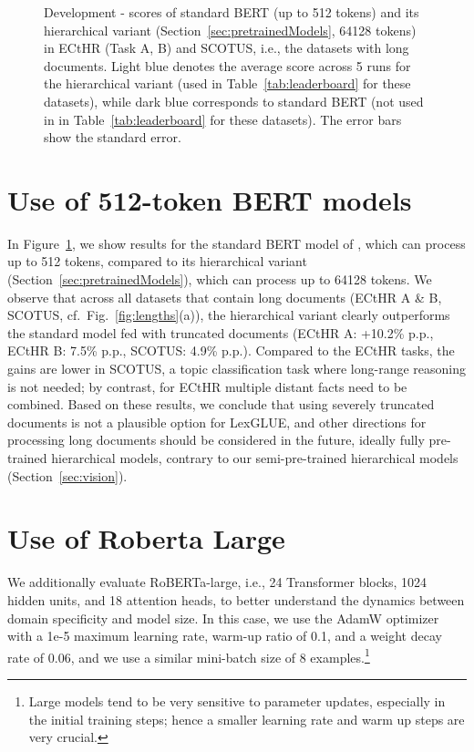\documentclass[11pt]{article}
\newcommand{\macrof}{-\xspace}
\begin{document}
\begin{figure}[h]
    \centering
    \caption{Development \macrof scores of standard BERT (up to 512 tokens) and its hierarchical variant (Section~\ref{sec:pretrainedModels}, 64128 tokens) in ECtHR (Task A, B) and SCOTUS, i.e., the datasets with long documents. Light blue denotes the average score across 5 runs for the hierarchical variant (used in Table~\ref{tab:leaderboard} for these datasets), while dark blue corresponds to standard BERT (not used in in Table~\ref{tab:leaderboard} for these datasets). The error bars show the standard error.
    }
    \vspace{-2mm}
    \label{fig:bert_base_truncated}
    \vspace{-4mm}
\end{figure}

\section{Use of 512-token BERT models}
\label{sec:bert_truncated}
In Figure~\ref{fig:bert_base_truncated}, we show results for the standard BERT model of \citet{devlin-etal-2019-bert}, which can process up to 512 tokens, compared to its hierarchical variant (Section~\ref{sec:pretrainedModels}), which can process up to 64128 tokens. We observe that across all datasets that contain long documents (ECtHR A \& B, SCOTUS, cf.\ Fig.~\ref{fig:lengths}(a)), the hierarchical variant clearly outperforms the standard model fed with truncated documents (ECtHR A: +10.2\% p.p., ECtHR B: 7.5\% p.p., SCOTUS: 4.9\% p.p.). Compared to the ECtHR tasks, the gains are lower in SCOTUS, a topic classification task where long-range reasoning is not needed; by contrast, for ECtHR multiple distant facts need to be combined. Based on these results, we conclude that using severely truncated documents is not a plausible option for LexGLUE, and other directions for processing long documents should be considered in the future, ideally fully pre-trained hierarchical models, contrary to our semi-pre-trained hierarchical models (Section~\ref{sec:vision}).

\section{Use of Roberta Large}
\label{sec:roberta-large}

We additionally evaluate RoBERTa-large, i.e., 24 Transformer blocks, 1024 hidden units, and 18 attention heads, to better understand the dynamics between domain specificity and model size. In this case, we use the AdamW optimizer with a 1e-5 maximum learning rate,  warm-up ratio of 0.1, and a weight decay rate of 0.06, and we use a similar mini-batch size of 8 examples.\footnote{Large models tend to be very sensitive to parameter updates, especially in the initial training steps; hence a smaller learning rate and warm up steps are very crucial.}
\end{document}
